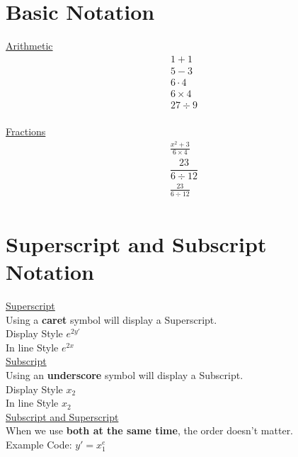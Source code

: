 \documentclass{article}
\begin{document}
    \section{Basic Notation}
        \underline{Arithmetic}
        \begin{align*}
            1 + 1 \\
            5 - 3 \\
            6 \cdot 4 \\
            6 \times 4 \\
            27 \div 9 \\
        \end{align*}

        \underline{Fractions}
        \begin{align*}
            \frac{x^2 + 3}{6 \times 4} \\
            \dfrac{23}{6 \div 12} \\ 
            \tfrac{23}{6 \div 12} \\
        \end{align*}


    \section{Superscript and Subscript Notation}
        {\large \underline{Superscript}} \\
        Using a \textbf{caret} symbol will display a Superscript. \\
        Display Style \( \displaystyle e^{2y'} \) \\
        In line Style \( \textstyle e^{2x} \) \\[\baselineskip]

        {\large \underline{Subscript}} \\
        Using an \textbf{underscore} symbol will display a Subscript. \\
        Display Style \( \displaystyle x_2 \) \\
        In line Style \( \textstyle x_2 \) \\[\baselineskip]

        {\large \underline{Subscript and Superscript}} \\
        When we use \textbf{both at the same time}, the order doesn't matter. \\
        Example Code: \( \displaystyle y' = x^e_1  \) \\[\baselineskip] 
\end{document}

